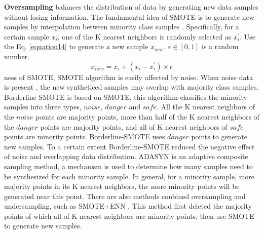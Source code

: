 \documentclass[ida]{iosart2x}
\begin{document}
\textbf{Oversampling} balances the distribution of data 
by generating new data samples without losing information.
The fundamental idea of SMOTE is to generate new samples by interpolation between minority class samples \cite{2018SMOTE}.
Specifically, for a certain sample $x_i$, one of the K nearest neighbors is randomly selected as $x_i ^{'}$.
Use the Eq. \ref{equation14} to generate a new sample $x_{new}$. $\epsilon \in [0,1]$ is a random number.
\begin{equation}
  \label{equation14}
  x_{new}=x_i+(x_i-x_i^{'})\times \epsilon
\end{equation}ness of SMOTE,
 SMOTE algorithm is easily affected by noise.
When noise data is present
, the new syntheticed samples may overlap with majority class samples.
Borderline-SMOTE \cite{2005Borderline} is based on SMOTE, this algorithm classifies
the minority samples into three types, 
$noise$, $danger$ and $safe$.
All the K nearest neighbors of the $noise$ points are majority points, 
more than half of the K nearest neighbors 
of the $danger$ points are majority points, 
and all of K nearest neighbors of $safe$ points are minority points.
Borderline-SMOTE uses $danger$ points to generate new samples.
To a certain extent Borderline-SMOTE reduced the negative effect of noise and overlapping data distribution.
ADASYN \cite{2008ADASYN} is an adaptive composite sampling method, 
a mechanism is used to determine how many samples need to be synthesized for each minority sample.
In general, for a minority sample, more majority points in its K nearest neighbors, 
the more minority points will be generated near this point.
There are also methods conbined oversampling and undersampling, such as SMOTE+ENN \cite{2019Electrocardiogram},
This method first deleted the majority points of which all of K nearest neighbors are minority points,
then use SMOTE to generate new samples.
\end{document}
